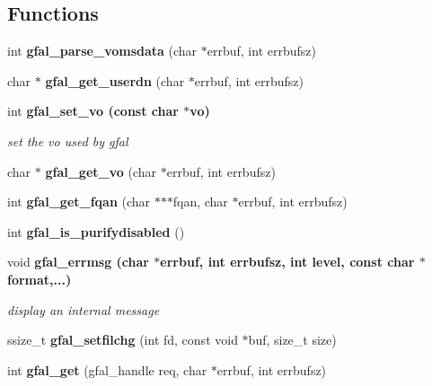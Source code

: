 \subsection*{Functions}
\begin{CompactItemize}
\item 
int \textbf{gfal\_\-parse\_\-vomsdata} (char $\ast$errbuf, int errbufsz)\label{gfal__common_8c_54942230ba2576538e1ad096332950b8}

\item 
char $\ast$ \textbf{gfal\_\-get\_\-userdn} (char $\ast$errbuf, int errbufsz)\label{group__internal__group_g6bd6336b0fee1ff32ad6bc5ef3d96068}

\item 
int \bf{gfal\_\-set\_\-vo} (const char $\ast$vo)\label{group__common__group_gcf4ae9045b7e5a2a697b1bb1f05994a8}

\begin{CompactList}\small\item\em set the vo used by gfal \item\end{CompactList}\item 
char $\ast$ \textbf{gfal\_\-get\_\-vo} (char $\ast$errbuf, int errbufsz)\label{group__internal__group_g1d7294ee456d16c8b1bf40f97ffb5081}

\item 
int \textbf{gfal\_\-get\_\-fqan} (char $\ast$$\ast$$\ast$fqan, char $\ast$errbuf, int errbufsz)\label{group__internal__group_g54b4e29078838583c8022630ef5a2ed3}

\item 
int \textbf{gfal\_\-is\_\-purifydisabled} ()\label{group__internal__group_g3a35f0e6f616c5108f95cfffd557db77}

\item 
void \bf{gfal\_\-errmsg} (char $\ast$errbuf, int errbufsz, int level, const char $\ast$format,...)
\begin{CompactList}\small\item\em display an internal message \item\end{CompactList}\item 
ssize\_\-t \textbf{gfal\_\-setfilchg} (int fd, const void $\ast$buf, size\_\-t size)\label{group__posix__group_g45a23756f2c79a7e07488bb3fb2fc35e}

\item 
int \textbf{gfal\_\-get} (gfal\_\-handle req, char $\ast$errbuf, int errbufsz)\label{gfal__common_8c_57905e23b13d796db3cacb99a3b1392c}


\end{CompactItemize}
